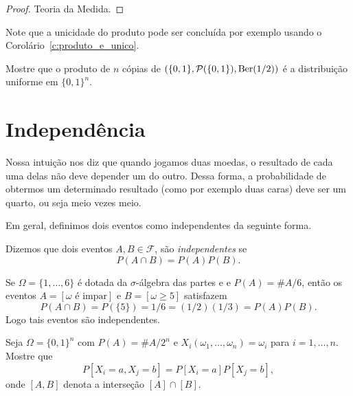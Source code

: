 \begin{proof}
  Teoria da Medida.
\end{proof}

Note que a unicidade do produto pode ser concluída por exemplo usando o Corolário~\ref{c:produto_e_unico}.

\begin{exercise}
  Mostre que o produto de $n$ cópias de $(\{0,1\}, \mathcal{P}(\{0,1\}), \operatorname{Ber}(1/2))$ é a distribuição uniforme em $\{0,1\}^n$.
\end{exercise}

\section{Independência}

Nossa intuição nos diz que quando jogamos duas moedas, o resultado de cada uma delas não deve depender um do outro.
Dessa forma, a probabilidade de obtermos um determinado resultado (como por exemplo duas caras) deve ser um quarto, ou seja meio vezes meio.

Em geral, definimos dois eventos como independentes da seguinte forma.

\begin{definition}
  Dizemos que dois eventos $A, B \in \mathcal{F}$, são \emph{independentes}  se
  \begin{equation}
    P(A \cap B) = P(A) P(B).
  \end{equation}
\end{definition}

\begin{example}
  Se $\Omega = \{1, \dots, 6\}$ é dotada da $\sigma$-álgebra das partes e e $P(A) = \#A/6$, então os eventos $A = [\omega \text{ é impar}]$ e $B = [\omega \geq 5]$ satisfazem
  \begin{equation}
    P(A \cap B) = P(\{5\}) = 1/6 = (1/2) (1/3) = P(A) P(B).
  \end{equation}
  Logo tais eventos são independentes.
\end{example}

\begin{exercise}
  Seja $\Omega = \{0,1\}^n$ com $P(A) = \#A/2^n$ e $X_i(\omega_1, \dots, \omega_n) = \omega_i$ para $i = 1, \dots, n$.
  Mostre que
  \begin{equation}
    P[X_i = a, X_j = b] = P[X_i = a] P[X_j = b],
  \end{equation}
  onde $[A, B]$ denota a interseção $[A] \cap [B]$.
\end{exercise}


